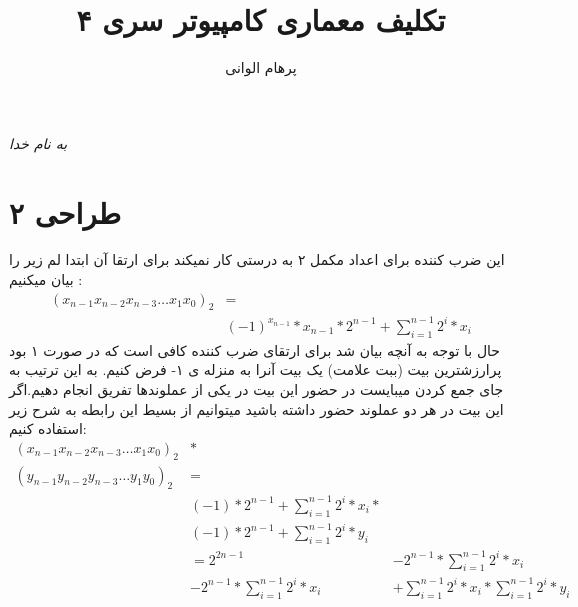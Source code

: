 \documentclass[11pt]{article}
\author{پرهام الوانی}
\title{تکلیف معماری کامپیوتر سری ۴}
\begin{document}
\begin{titlepage}
\begin{center}
\emph{به نام خدا}
\end{center}
\maketitle
\begin{center}
\end{center}
\end{titlepage}
\tableofcontents
\newpage
\section{طراحی ۲}
این ضرب کننده برای اعداد مکمل ۲ به درستی کار نمیکند برای ارتقا آن ابتدا لم زیر را بیان میکنیم :
\begin{align*}
	(x_{n-1}x_{n-2}x_{n-3} \ldots x_1x_0)_2 &= \\
	&(-1)^{x_{n-1}} * x_{n-1} * 2^{n-1} + \sum_{i=1}^{n-1}{2^i*x_i}
\end{align*}
حال با توجه به آنچه بیان شد برای ارتقای ضرب کننده کافی است که در صورت ۱ بود پرارزشترین بیت (ببت علامت) یک بیت آنرا به منزله ی ۱- فرض کنیم. به این ترتیب به جای جمع کردن
میبایست در حضور این بیت در یکی از عملوندها تفریق انجام دهیم.اگر این بیت در هر دو عملوند حضور داشته باشید میتوانیم از بسیط این رابطه به شرح زیر استفاده کنیم:
\begin{align*}
(x_{n-1}x_{n-2}x_{n-3} \ldots x_1x_0)_2 &* \\
(y_{n-1}y_{n-2}y_{n-3} \ldots y_1y_0)_2 &= \\
&(-1) * 2^{n-1} + \sum_{i=1}^{n-1}{2^i*x_i} *& \\
&(-1) * 2^{n-1} + \sum_{i=1}^{n-1}{2^i*y_i} \\
&= 2^{2n-1} &- 2^{n-1} * \sum_{i=1}^{n-1}{2^i*x_i} \\
&- 2^{n-1} * \sum_{i=1}^{n-1}{2^i*x_i} &+ \sum_{i=1}^{n-1}{2^i*x_i} * \sum_{i=1}^{n-1}{2^i*y_i}
\end{align*}
\end{document}
